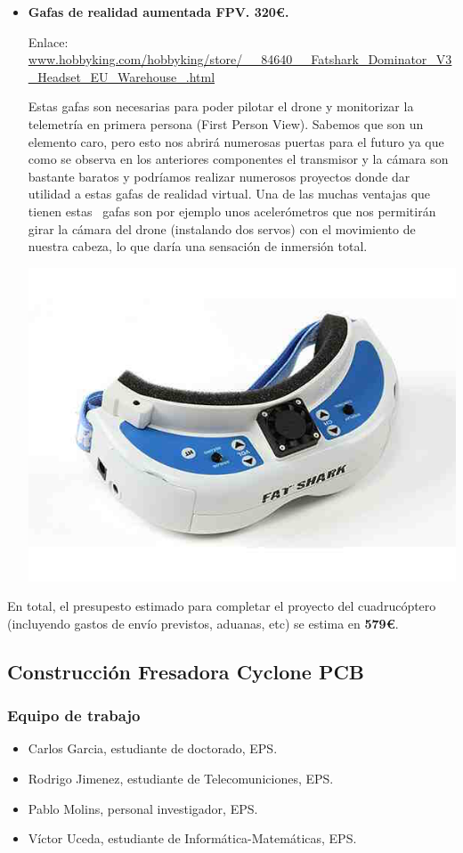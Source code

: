 \documentclass[12pt,twoside]{report}
\begin{document}
\begin{itemize}
\item {\bf Gafas de realidad aumentada FPV. 320\euro{}.}

Enlace: \url{www.hobbyking.com/hobbyking/store/__84640__Fatshark_Dominator_V3_Headset_EU_Warehouse_.html}

Estas gafas son necesarias para poder pilotar el drone y monitorizar la telemetría en primera persona (First Person View). Sabemos que son un elemento caro, pero esto nos abrirá numerosas puertas para el futuro ya que como se observa en los anteriores componentes el transmisor y la cámara son bastante baratos y podríamos realizar numerosos proyectos donde dar utilidad a estas gafas de realidad virtual. Una de las muchas ventajas que tienen estas  gafas son por ejemplo unos acelerómetros que nos permitirán girar la cámara del drone (instalando dos servos) con el movimiento de nuestra cabeza, lo que daría una sensación de inmersión total.

\centerline{
    \includegraphics[width=0.45\linewidth]{fotos/gafas.jpg}}

\end{itemize}

En total, el presupesto estimado para completar el proyecto del cuadrucóptero (incluyendo gastos de envío previstos, aduanas, etc) se estima en \textbf{579\euro{}}.








\subsection{Construcción Fresadora Cyclone PCB}
\subsubsection{Equipo de trabajo}
\begin{itemize}
\item Carlos Garcia, estudiante de doctorado, EPS.
\item Rodrigo Jimenez, estudiante de Telecomuniciones, EPS.
\item Pablo Molins, personal investigador, EPS.
\item Víctor Uceda, estudiante de Informática-Matemáticas, EPS.
\end{itemize}
\end{document}
